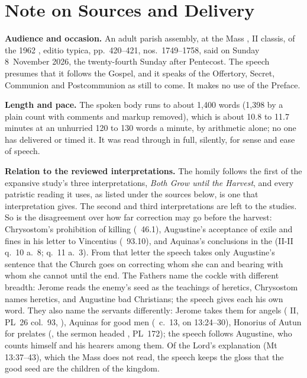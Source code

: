 
\section*{Note on Sources and Delivery}

{\footnotesize

\textbf{Audience and occasion.} An adult parish assembly, at the Mass
, II classis, of the
1962 , editio typica, pp.~420--421, nos.~1749--1758,
said on Sunday 8~November 2026, the twenty-fourth Sunday after Pentecost. The
speech presumes that it follows the Gospel, and it speaks of the Offertory,
Secret, Communion and Postcommunion as still to come. It makes no use of the
Preface.

\textbf{Length and pace.} The spoken body runs to about 1,400 words (1,398 by
a plain count with comments and markup removed), which is about 10.8
to 11.7 minutes at an unhurried 120 to 130 words a minute, by arithmetic
alone; no one has delivered or timed it. It was read through in full,
silently, for sense and ease of speech.

\textbf{Relation to the reviewed interpretations.} The homily follows the
first of the expansive study's three interpretations, \textit{Both Grow until
the Harvest}, and every patristic reading it uses, as listed under the
sources below, is one that interpretation gives. The second and third
interpretations are left to the studies.
So is the disagreement over how far correction may go before the harvest:
Chrysostom's prohibition of killing (\ 46.1), Augustine's
acceptance of exile and fines in his letter to Vincentius (~93.10),
and Aquinas's conclusions in the  (II-II q.~10 a.~8; q.~11
a.~3). From that letter the speech takes only Augustine's sentence that the
Church goes on correcting whom she can and bearing with whom she cannot until
the end. The Fathers name the cockle with different breadth: Jerome reads the
enemy's seed as the teachings of heretics, Chrysostom names heretics, and
Augustine bad Christians; the speech gives each his own word. They also name
the servants differently: Jerome takes them for angels (
II, PL~26 col.~93, ), Aquinas for good men (\ c.~13, on 13:24--30),
Honorius of Autun for prelates (, the sermon headed
, PL~172); the speech follows Augustine, who counts
himself and his hearers among them. Of the Lord's explanation (Mt
13:37--43), which the Mass does not read, the speech keeps the gloss that the
good seed are the children of the kingdom.

}
